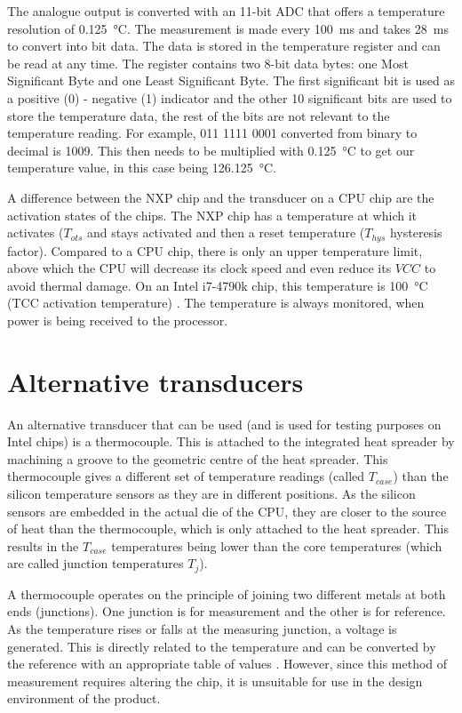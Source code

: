 \documentclass[conference]{IEEEtran}
\begin{document}
The analogue output is converted with an 11-bit ADC that offers a temperature resolution of \SI{0.125}{\celsius}. The measurement is made every \SI{100}{\milli\second} and takes \SI{28}{\milli\second} to convert into bit data. The data is stored in the temperature register and can be read at any time. The register contains two 8-bit data bytes: one Most Significant Byte and one Least Significant Byte. The first significant bit is used as a positive (0) - negative (1) indicator and the other 10 significant bits are used to store the temperature data, the rest of the bits are not relevant to the temperature reading. For example, 011 1111 0001 converted from binary to decimal is 1009. This then needs to be multiplied with \SI{0.125}{\celsius} to get our temperature value, in this case being \SI{126.125}{\celsius}.

A difference between the NXP chip and the transducer on a CPU chip are the activation states of the chips. The NXP chip has a temperature at which it activates ($T_{ots}$ and stays activated and then a reset temperature ($T_{hys}$ hysteresis factor). Compared to a CPU chip, there is only an upper temperature limit, above which the CPU will decrease its clock speed and even reduce its $VCC$ to avoid thermal damage. On an Intel i7-4790k chip, this temperature is \SI{100}{\celsius} (TCC activation temperature) \cite{b4}. The temperature is always monitored, when power is being received to the processor.
\section{Alternative transducers}
An alternative transducer that can be used (and is used for testing purposes on Intel chips) is a thermocouple. This is attached to the integrated heat spreader by machining a groove to the geometric centre of the heat spreader. This thermocouple gives a different set of temperature readings (called $T_{case}$) than the silicon temperature sensors as they are in different positions. As the silicon sensors are embedded in the actual die of the CPU, they are closer to the source of heat than the thermocouple, which is only attached to the heat spreader. This results in the $T_{case}$ temperatures being lower than the core temperatures (which are called junction temperatures $T_{j}$).

A thermocouple operates on the principle of joining two different metals at both ends (junctions). One junction is for measurement and the other is for reference. As the temperature rises or falls at the measuring junction, a voltage is generated. This is directly related to the temperature and can be converted by the reference with an appropriate table of values \cite{b5}. However, since this method of measurement requires altering the chip, it is unsuitable for use in the design environment of the product.
\end{document}

